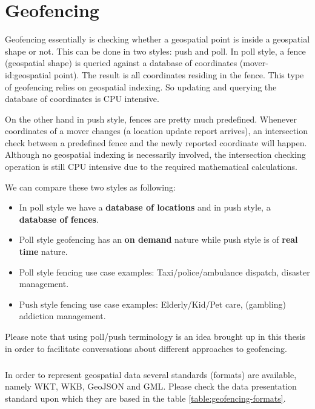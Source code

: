 \documentclass[a4]{report}
\begin{document}
    \chapter{Geofencing}
    Geofencing essentially is checking whether a geospatial point is inside a geospatial shape or not.
    This can be done in two styles: push and poll.
    In poll style, a fence (geospatial shape) is queried against a database of coordinates (mover-id:geospatial point).
    The result is all coordinates residing in the fence.
    This type of geofencing relies on geospatial indexing.
    So updating and querying the database of coordinates is CPU intensive.

    On the other hand in push style, fences are pretty much predefined.
    Whenever coordinates of a mover changes (a location update report arrives), an intersection check between a
    predefined fence and the newly reported coordinate will happen.
    Although no geospatial indexing is necessarily involved, the intersection checking operation is still CPU
    intensive due to the required mathematical calculations.

    We can compare these two styles as following:
    \begin{itemize}
        \item In poll style we have a \textbf{database of locations} and in push style, a \textbf{database of fences}.
        \item Poll style geofencing has an \textbf{on demand} nature while push style is of \textbf{real time} nature.
        \item Poll style fencing use case examples: Taxi/police/ambulance dispatch, disaster management.
        \item Push style fencing use case examples: Elderly/Kid/Pet care, (gambling) addiction management.
    \end{itemize}

    Please note that using poll/push terminology is an idea brought up in this thesis in order to facilitate
    conversations about different approaches to geofencing.

    \paragraph{}
    In order to represent geospatial data several standards (formats) are available, namely WKT\cite{WKT}, WKB\cite{wkb},
    GeoJSON\cite{geoJson} and GML\cite{gml}.
    Please check the data presentation standard upon which they are based in the table \ref{table:geofencing-formats}.
\end{document}
